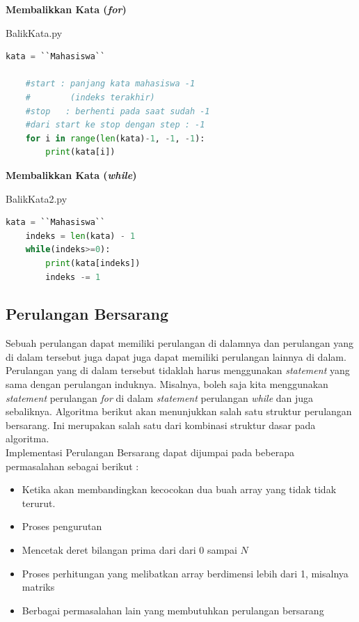 \begin{contoh}
	\textbf{Membalikkan Kata (\textit{for})}
\begin{listprog}{BalikKata.py}
\label{lst:BalikKata}
\begin{lstlisting}[language=Python]
	kata = ``Mahasiswa``
	
	#start : panjang kata mahasiswa -1 
	#        (indeks terakhir)
	#stop	: berhenti pada saat sudah -1
	#dari start ke stop dengan step : -1
	for i in range(len(kata)-1, -1, -1):
		print(kata[i])
\end{lstlisting}
\end{listprog}
\end{contoh}

\begin{contoh}
	\textbf{Membalikkan Kata (\textit{while})}
\begin{listprog}{BalikKata2.py}
\label{lst:BalikKata2}
\begin{lstlisting}[language=Python]
	kata = ``Mahasiswa``
	indeks = len(kata) - 1
	while(indeks>=0):
		print(kata[indeks])
		indeks -= 1
	\end{lstlisting}
\end{listprog}
\end{contoh}


\FloatBarrier
\subsection{Perulangan Bersarang}
Sebuah perulangan dapat memiliki perulangan di dalamnya dan perulangan yang di dalam tersebut juga dapat juga dapat memiliki perulangan lainnya di dalam. Perulangan yang di dalam tersebut tidaklah harus menggunakan \textit{statement} yang sama dengan perulangan induknya. Misalnya, boleh saja kita menggunakan \textit{statement} perulangan \textit{for} di dalam \textit{statement} perulangan \textit{while} dan juga sebaliknya. Algoritma berikut akan menunjukkan salah satu struktur perulangan bersarang. Ini merupakan salah satu dari kombinasi struktur dasar pada algoritma. \\

Implementasi Perulangan Bersarang dapat dijumpai pada beberapa permasalahan sebagai berikut : 
\begin{itemize}
	\item Ketika akan membandingkan kecocokan dua buah array yang tidak tidak terurut. 
	\item Proses pengurutan 
	\item Mencetak deret bilangan prima dari dari 0 sampai $N$
	\item Proses perhitungan yang melibatkan array berdimensi lebih dari 1, misalnya matriks
	\item Berbagai permasalahan lain yang membutuhkan perulangan bersarang
\end{itemize}


